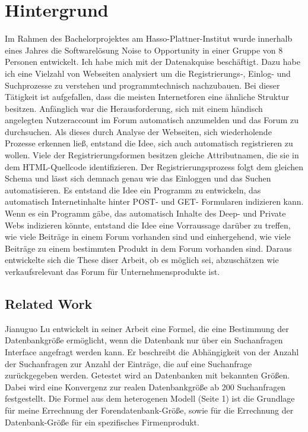 \section{Hintergrund}

Im Rahmen des Bachelorprojektes am Hasso-Plattner-Institut wurde innerhalb eines Jahres die Softwarelösung Noise to Opportunity in einer Gruppe von 8 Personen entwickelt. Ich habe mich mit der Datenakquise beschäftigt. Dazu habe ich eine Vielzahl von Webseiten analysiert um die Registrierungs-, Einlog- und Suchprozesse zu verstehen und programmtechnisch nachzubauen. Bei dieser Tätigkeit ist aufgefallen, dass die meisten Internetforen eine ähnliche Struktur besitzen. Anfänglich war die Herausforderung, sich mit einem händisch angelegten Nutzeraccount im Forum automatisch anzumelden und das Forum zu durchsuchen. Als dieses durch Analyse der Webseiten, sich wiederholende Prozesse erkennen ließ, entstand die Idee, sich auch automatisch registrieren zu wollen.
Viele der Registrierungsformen besitzen gleiche Attributnamen, die sie in dem HTML-Quellcode identifizieren. Der Registrierungsprozess folgt dem gleichen Schema und lässt sich demnach genau wie das Einloggen und das Suchen automatisieren. Es entstand die Idee ein Programm zu entwickeln, das  automatisch Internetinhalte hinter POST- und GET- Formularen indizieren kann. Wenn es ein Programm gäbe, das automatisch Inhalte des Deep- und Private Webs indizieren könnte, entstand die Idee eine Vorraussage darüber zu treffen, wie viele Beiträge in einem Forum vorhanden sind und einhergehend, wie viele Beiträge zu einem bestimmten Produkt in dem Forum vorhanden sind.
Daraus entwickelte sich die These diser Arbeit, ob es möglich sei, abzuschätzen wie verkaufsrelevant das Forum für Unternehmensprodukte ist.

\subsection{Related Work}

Jianuguo Lu \cite{lu2008efficient} entwickelt in seiner Arbeit eine Formel, die eine Bestimmung der Datenbankgröße ermöglicht, wenn die Datenbank nur über ein Suchanfragen Interface angefragt werden kann. Er beschreibt die Abhängigkeit von der Anzahl der Suchanfragen zur Anzahl der Einträge, die auf eine Suchanfrage zurückgegeben werden. Getestet wird an Datenbanken mit bekannten Größen. Dabei wird eine Konvergenz zur realen Datenbankgröße ab 200 Suchanfragen festgestellt. Die Formel aus dem heterogenen Modell (Seite 1) ist die Grundlage für meine Errechnung der Forendatenbank-Größe, sowie für die Errechnung der Datenbank-Größe für ein spezifisches Firmenprodukt.

